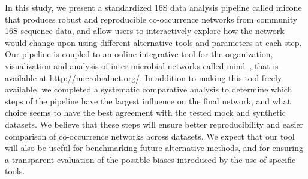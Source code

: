  In this study, we present a standardized 16S data analysis pipeline called \ac{micone} that produces robust and reproducible co-occurrence networks from community 16S sequence data, and allow users to interactively explore how the network would change upon using different alternative tools and parameters at each step.
 Our pipeline is coupled to an online integrative tool for the organization, visualization and analysis of inter-microbial networks called \ac{mind}~\cite{huResourceComparisonIntegration2022}, that is available at \href{http://microbialnet.org/}{http://microbialnet.org/}.
  In addition to making this tool freely available, we completed a systematic comparative analysis to determine which steps of the pipeline have the largest influence on the final network, and what choice seems to have the best agreement with the tested mock and synthetic datasets.
  We believe that these steps will ensure better reproducibility and easier comparison of co-occurrence networks across datasets.
  We expect that our tool will also be useful for benchmarking future alternative methods, and for ensuring a transparent evaluation of the possible biases introduced by the use of specific tools.

